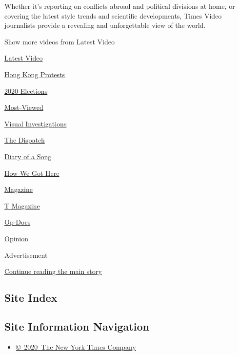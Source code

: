Whether it's reporting on conflicts abroad and political divisions at
home, or covering the latest style trends and scientific developments,
Times Video journalists provide a revealing and unforgettable view of
the world.

Show more videos from Latest Video

\href{/video}{}

\href{/video/latest-video}{Latest Video}

\href{/video/hk-protest}{Hong Kong Protests}

\href{/video/2020-Elections}{2020 Elections}

\href{/video/Most-Viewed}{Most-Viewed}

\href{/video/investigations}{Visual Investigations}

\href{/video/on-the-ground}{The Dispatch}

\href{/video/diaryofasong}{Diary of a Song}

\href{/video/how-we-got-here}{How We Got Here}

\href{/video/magazine}{Magazine}

\href{/video/t-magazine}{T Magazine}

\href{/video/op-docs}{Op-Docs}

\href{/video/opinion}{Opinion}

Advertisement

\protect\hyperlink{after-bottom}{Continue reading the main story}

\hypertarget{site-index}{%
\subsection{Site Index}\label{site-index}}

\hypertarget{site-information-navigation}{%
\subsection{Site Information
Navigation}\label{site-information-navigation}}

\begin{itemize}
\tightlist
\item
  \href{https://help.nytimes3xbfgragh.onion/hc/en-us/articles/115014792127-Copyright-notice}{©~2020~The
  New York Times Company}
\end{itemize}

